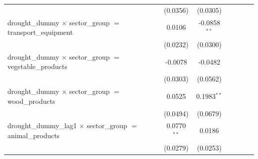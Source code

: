 \begin{tabular}{lcccccccc}
                                                                                  &                       &                       & (0.0356)              & (0.0305)              &                       &                       &                       &   \\   
   drought\_dummy $\times$ sector\_group $=$ transport\_equipment                 &                       &                       & 0.0106                & -0.0858$^{**}$        &                       &                       &                       &   \\   
                                                                                  &                       &                       & (0.0232)              & (0.0300)              &                       &                       &                       &   \\   
   drought\_dummy $\times$ sector\_group $=$ vegetable\_products                  &                       &                       & -0.0078               & -0.0482               &                       &                       &                       &   \\   
                                                                                  &                       &                       & (0.0303)              & (0.0562)              &                       &                       &                       &   \\   
   drought\_dummy $\times$ sector\_group $=$ wood\_products                       &                       &                       & 0.0525                & 0.1983$^{**}$         &                       &                       &                       &   \\   
                                                                                  &                       &                       & (0.0494)              & (0.0679)              &                       &                       &                       &   \\   
   drought\_dummy\_lag1 $\times$ sector\_group $=$ animal\_products               &                       &                       & 0.0770$^{**}$         & 0.0186                &                       &                       &                       &   \\   
                                                                                  &                       &                       & (0.0279)              & (0.0253)              &                       &                       &                       &   \\   

\end{tabular}
